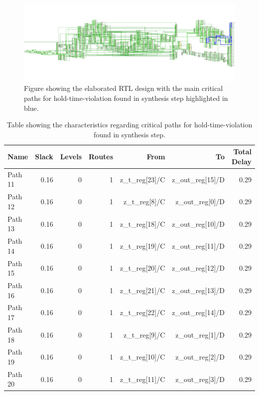 \begin{figure}[H]
    \centering
    \includegraphics[width=\textwidth]{./images/Vivado/hold_synthesis.pdf}
    \caption{Figure showing the elaborated RTL design with the main critical paths for hold-time-violation found in synthesis step highlighted in blue.}
    \label{fig:hold_synthesis}
\end{figure}  

\begin{table}[ht]
    \centering
    \small
    \captionsetup{skip=10pt} 
    \begin{tabular}{lrrrrrr}
        \hline
        Name    & Slack & Levels & Routes  & From           & To               & Total Delay \\
        \hline
        Path 11 & 0.16  & 0      & 1       & z\_t\_reg[23]/C & z\_out\_reg[15]/D & 0.29       \\
        Path 12 & 0.16  & 0      & 1       & z\_t\_reg[8]/C  & z\_out\_reg[0]/D  & 0.29       \\
        Path 13 & 0.16  & 0      & 1       & z\_t\_reg[18]/C & z\_out\_reg[10]/D & 0.29       \\
        Path 14 & 0.16  & 0      & 1       & z\_t\_reg[19]/C & z\_out\_reg[11]/D & 0.29       \\
        Path 15 & 0.16  & 0      & 1       & z\_t\_reg[20]/C & z\_out\_reg[12]/D & 0.29       \\
        Path 16 & 0.16  & 0      & 1       & z\_t\_reg[21]/C & z\_out\_reg[13]/D & 0.29       \\
        Path 17 & 0.16  & 0      & 1       & z\_t\_reg[22]/C & z\_out\_reg[14]/D & 0.29       \\
        Path 18 & 0.16  & 0      & 1       & z\_t\_reg[9]/C  & z\_out\_reg[1]/D  & 0.29       \\
        Path 19 & 0.16  & 0      & 1       & z\_t\_reg[10]/C & z\_out\_reg[2]/D  & 0.29       \\
        Path 20 & 0.16  & 0      & 1       & z\_t\_reg[11]/C & z\_out\_reg[3]/D  & 0.29       \\
        \hline
    \end{tabular}
    \caption{Table showing the characteristics regarding critical paths for hold-time-violation found in synthesis step.}
    \label{tab:hold_synthesis}
\end{table}


